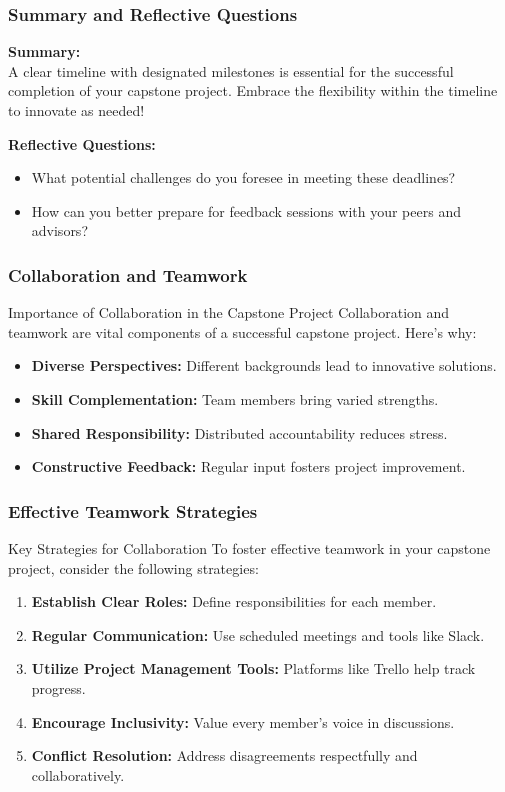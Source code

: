 \documentclass[aspectratio=169]{beamer}
\begin{document}
\begin{frame}[fragile]
    \frametitle{Summary and Reflective Questions}
    \textbf{Summary:} \\
    A clear timeline with designated milestones is essential for the successful completion of your capstone project. Embrace the flexibility within the timeline to innovate as needed!

    \textbf{Reflective Questions:}
    \begin{itemize}
        \item What potential challenges do you foresee in meeting these deadlines?
        \item How can you better prepare for feedback sessions with your peers and advisors?
    \end{itemize}
\end{frame}

\begin{frame}[fragile]
    \frametitle{Collaboration and Teamwork}
    \begin{block}{Importance of Collaboration in the Capstone Project}
        Collaboration and teamwork are vital components of a successful capstone project. Here’s why:
    \end{block}
    \begin{itemize}
        \item \textbf{Diverse Perspectives:} Different backgrounds lead to innovative solutions.
        \item \textbf{Skill Complementation:} Team members bring varied strengths.
        \item \textbf{Shared Responsibility:} Distributed accountability reduces stress.
        \item \textbf{Constructive Feedback:} Regular input fosters project improvement.
    \end{itemize}
\end{frame}

\begin{frame}[fragile]
    \frametitle{Effective Teamwork Strategies}
    \begin{block}{Key Strategies for Collaboration}
        To foster effective teamwork in your capstone project, consider the following strategies:
    \end{block}
    \begin{enumerate}
        \item \textbf{Establish Clear Roles:} Define responsibilities for each member.
        \item \textbf{Regular Communication:} Use scheduled meetings and tools like Slack.
        \item \textbf{Utilize Project Management Tools:} Platforms like Trello help track progress.
        \item \textbf{Encourage Inclusivity:} Value every member's voice in discussions.
        \item \textbf{Conflict Resolution:} Address disagreements respectfully and collaboratively.
    \end{enumerate}
\end{frame}
\end{document}
